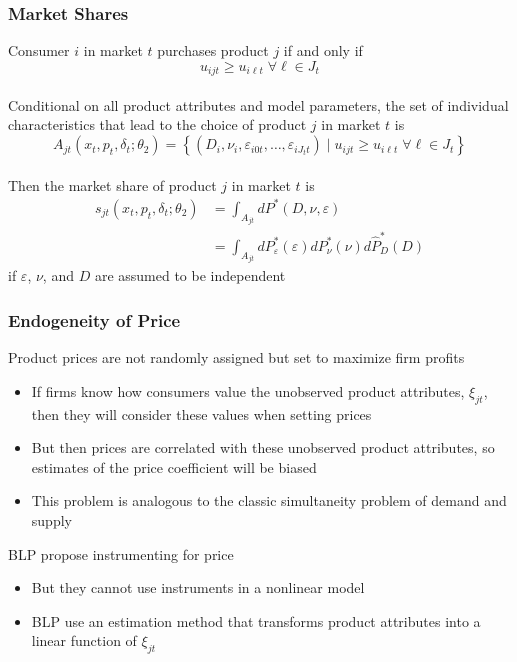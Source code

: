 \documentclass{beamer}
\begin{document}
\begin{frame}\frametitle{Market Shares}
    Consumer $i$ in market $t$ purchases product $j$ if and only if
    $$u_{ijt} \geq u_{i \ell t} \; \forall \ell \in J_t$$ \\
    \vspace{2ex}
    Conditional on all product attributes and model parameters, the set of individual characteristics that lead to the choice of product $j$ in market $t$ is
    $$A_{jt}(x_t, p_t, \delta_t; \theta_2) = \left\{ (D_i, \nu_i, \varepsilon_{i0t}, \ldots, \varepsilon_{iJ_tt}) \mid u_{ijt} \geq u_{i \ell t} \; \forall \ell \in J_t \right\}$$ \\
    \vspace{2ex}
    Then the market share of product $j$ in market $t$ is
    \begin{align*}
        s_{jt}(x_t, p_t, \delta_t; \theta_2) &= \int_{A_{jt}} dP^*(D, \nu, \varepsilon) \\
        &= \int_{A_{jt}} dP_{\varepsilon}^*(\varepsilon) dP_{\nu}^*(\nu) d\hat{P}_D^*(D)
    \end{align*}
    if $\varepsilon$, $\nu$, and $D$ are assumed to be independent
\end{frame}

\begin{frame}\frametitle{Endogeneity of Price}
    Product prices are not randomly assigned but set to maximize firm profits
    \begin{itemize}
        \item If firms know how consumers value the unobserved product attributes, $\xi_{jt}$, then they will consider these values when setting prices
        \item But then prices are correlated with these unobserved product attributes, so estimates of the price coefficient will be biased
        \item This problem is analogous to the classic simultaneity problem of demand and supply
    \end{itemize}
    \vspace{2ex}
    BLP propose instrumenting for price
    \begin{itemize}
        \item But they cannot use instruments in a nonlinear model
        \item BLP use an estimation method that transforms product attributes into a linear function of $\xi_{jt}$
    \end{itemize}
\end{frame}
\end{document}
